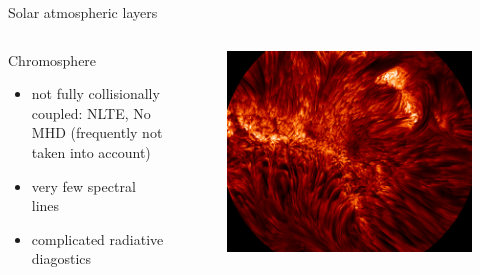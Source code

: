 \documentclass{beamer}
\begin{document}
\begin{frame}[t]{Solar atmospheric layers}
\vspace{0.1cm}
\begin{columns}[b]
    \begin{column}{0.6\textwidth}
		Chromosphere
        \begin{itemize}
					\item not fully collisionally coupled: NLTE, No MHD (frequently not taken into account)
					\item very few spectral lines 
					\item complicated radiative diagostics 
        \end{itemize}
    \end{column}
    \begin{column}{0.5\textwidth}
			\begin{figure}[t]
			 \centering
			 \includegraphics[scale=0.03]{chrom.png}
			\end{figure}
    \end{column}
\end{columns}


\end{frame}
\end{document}
